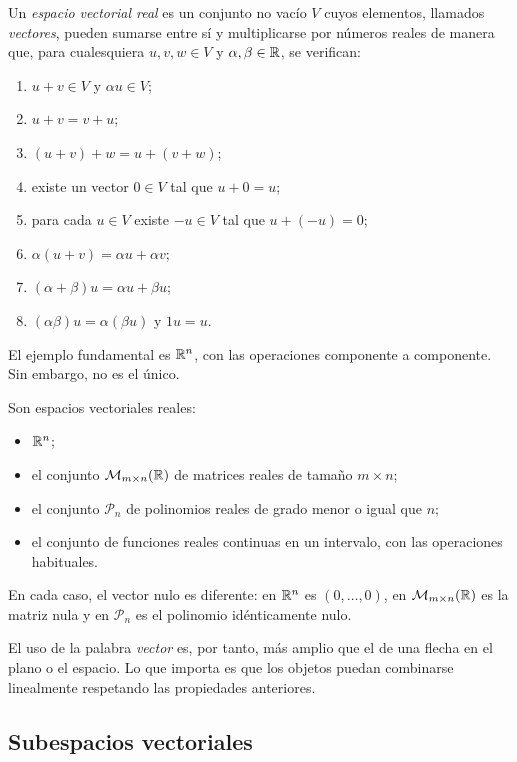 \begin{definition}
Un \emph{espacio vectorial real} es un conjunto no vacío $V$ cuyos elementos, llamados \emph{vectores}, pueden sumarse entre sí y multiplicarse por números reales de manera que, para cualesquiera $u,v,w\in V$ y $\alpha,\beta\in\mathbb{R}$, se verifican:
\begin{enumerate}
\item $u+v\in V$ y $\alpha u\in V$;
\item $u+v=v+u$;
\item $(u+v)+w=u+(v+w)$;
\item existe un vector $0\in V$ tal que $u+0=u$;
\item para cada $u\in V$ existe $-u\in V$ tal que $u+(-u)=0$;
\item $\alpha(u+v)=\alpha u+\alpha v$;
\item $(\alpha+\beta)u=\alpha u+\beta u$;
\item $(\alpha\beta)u=\alpha(\beta u)$ y $1u=u$.
\end{enumerate}
\end{definition}

El ejemplo fundamental es $\mathbb{R}^n$, con las operaciones componente a componente. Sin embargo, no es el único.

\begin{example}
Son espacios vectoriales reales:
\begin{itemize}
\item $\mathbb{R}^n$;
\item el conjunto $\mathcal M_{m\times n}(\mathbb{R})$ de matrices reales de tamaño $m\times n$;
\item el conjunto $\mathcal P_n$ de polinomios reales de grado menor o igual que $n$;
\item el conjunto de funciones reales continuas en un intervalo, con las operaciones habituales.
\end{itemize}
En cada caso, el vector nulo es diferente: en $\mathbb{R}^n$ es $(0,\ldots,0)$, en $\mathcal M_{m\times n}(\mathbb{R})$ es la matriz nula y en $\mathcal P_n$ es el polinomio idénticamente nulo.
\end{example}

El uso de la palabra \emph{vector} es, por tanto, más amplio que el de una flecha en el plano o el espacio. Lo que importa es que los objetos puedan combinarse linealmente respetando las propiedades anteriores.

\subsection{Subespacios vectoriales}

